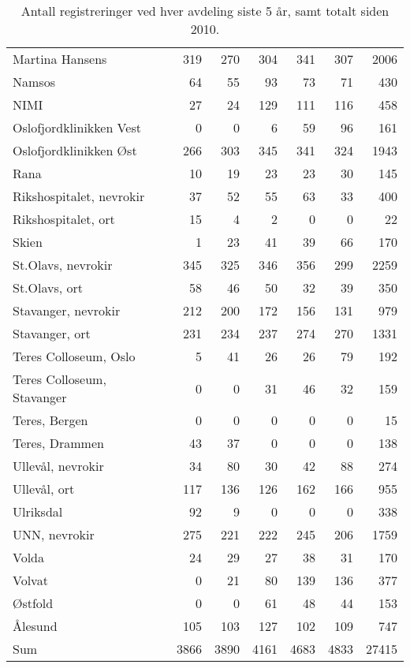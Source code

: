 \begin{table}[ht]
\begin{tabular}{lrrrrrr}
  Martina Hansens & 319 & 270 & 304 & 341 & 307 & 2006 \\ 
  Namsos & 64 & 55 & 93 & 73 & 71 & 430 \\ 
  NIMI & 27 & 24 & 129 & 111 & 116 & 458 \\ 
  Oslofjordklinikken Vest & 0 & 0 & 6 & 59 & 96 & 161 \\ 
  Oslofjordklinikken Øst & 266 & 303 & 345 & 341 & 324 & 1943 \\ 
  Rana & 10 & 19 & 23 & 23 & 30 & 145 \\ 
  Rikshospitalet, nevrokir & 37 & 52 & 55 & 63 & 33 & 400 \\ 
  Rikshospitalet, ort & 15 & 4 & 2 & 0 & 0 & 22 \\ 
  Skien & 1 & 23 & 41 & 39 & 66 & 170 \\ 
  St.Olavs, nevrokir & 345 & 325 & 346 & 356 & 299 & 2259 \\ 
  St.Olavs, ort & 58 & 46 & 50 & 32 & 39 & 350 \\ 
  Stavanger, nevrokir & 212 & 200 & 172 & 156 & 131 & 979 \\ 
  Stavanger, ort & 231 & 234 & 237 & 274 & 270 & 1331 \\ 
  Teres Colloseum, Oslo & 5 & 41 & 26 & 26 & 79 & 192 \\ 
  Teres Colloseum, Stavanger & 0 & 0 & 31 & 46 & 32 & 159 \\ 
  Teres, Bergen & 0 & 0 & 0 & 0 & 0 & 15 \\ 
  Teres, Drammen & 43 & 37 & 0 & 0 & 0 & 138 \\ 
  Ullevål, nevrokir & 34 & 80 & 30 & 42 & 88 & 274 \\ 
  Ullevål, ort & 117 & 136 & 126 & 162 & 166 & 955 \\ 
  Ulriksdal & 92 & 9 & 0 & 0 & 0 & 338 \\ 
  UNN, nevrokir & 275 & 221 & 222 & 245 & 206 & 1759 \\ 
  Volda & 24 & 29 & 27 & 38 & 31 & 170 \\ 
  Volvat & 0 & 21 & 80 & 139 & 136 & 377 \\ 
  Østfold & 0 & 0 & 61 & 48 & 44 & 153 \\ 
  Ålesund & 105 & 103 & 127 & 102 & 109 & 747 \\ 
  Sum & 3866 & 3890 & 4161 & 4683 & 4833 & 27415 \\ 
   \hline
\end{tabular}
\caption{Antall registreringer ved hver avdeling siste 5 år, samt totalt siden 2010.} 
\label{tab:AntReg}
\end{table}


